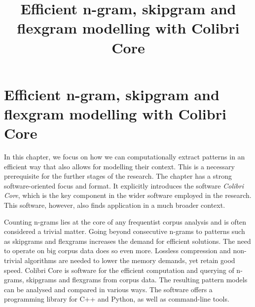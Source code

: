 







\title{Efficient n-gram, skipgram and flexgram modelling with Colibri Core}

\chapter{Efficient n-gram, skipgram and flexgram modelling with Colibri Core}
\label{chap:coco}

In this chapter, we focus on how we can computationally extract patterns in an efficient
way that also allows for modelling their context. This is a necessary
prerequisite for the further stages of the research.  The chapter has a strong
software-oriented focus and format. It explicitly introduces the software \emph{Colibri
Core}, which is the key component in the wider software employed in the research. This
software, however, also finds application in a much broader context.

Counting n-grams lies at the core of any frequentist corpus analysis and is
often considered a trivial matter. Going beyond consecutive n-grams to patterns
such as skipgrams and flexgrams increases the demand for efficient solutions.
The need to operate on big corpus data does so even more.  Lossless compression
and non-trivial algorithms are needed to lower the memory demands, yet retain
good speed. Colibri Core is software for the efficient computation and querying
of n-grams, skipgrams and flexgrams from corpus data. The resulting pattern
models can be analysed and compared in various ways. The software offers a
programming library for C++ and Python, as well as command-line tools.


